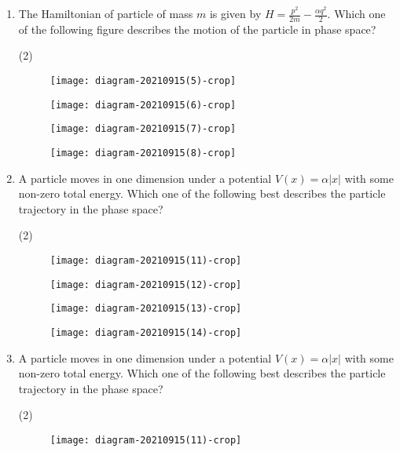 \begin{enumerate}
	\item The Hamiltonian of particle of mass $m$ is given by $H=\frac{p^{2}}{2 m}-\frac{\alpha q^{2}}{2}$. Which one of the following figure describes the motion of the particle in phase space?
	{}
	
	\begin{tasks}(2)
		\task[\textbf{A.}]\begin{figure}[H]
			\centering
			\texttt{[image: diagram-20210915(5)-crop]}
		\end{figure}
		\task[\textbf{B.}]\begin{figure}[H]
			\centering
			\texttt{[image: diagram-20210915(6)-crop]}
		\end{figure}
		\task[\textbf{C.}]\begin{figure}[H]
			\centering
			\texttt{[image: diagram-20210915(7)-crop]}
		\end{figure}
		\task[\textbf{D.}]\begin{figure}[H]
			\centering
			\texttt{[image: diagram-20210915(8)-crop]}
		\end{figure}
	\end{tasks}
	\item A particle moves in one dimension under a potential $V(x)=\alpha|x|$ with some non-zero total energy. Which one of the following best describes the particle trajectory in the phase space?
	{}
	
	\begin{tasks}(2)
		\task[\textbf{A.}]\begin{figure}[H]
			\centering
			\texttt{[image: diagram-20210915(11)-crop]}
			
		\end{figure}
		\task[\textbf{B.}]\begin{figure}[H]
			\centering
			\texttt{[image: diagram-20210915(12)-crop]}
		\end{figure}
		\task[\textbf{C.}]\begin{figure}[H]
			\centering
			\texttt{[image: diagram-20210915(13)-crop]}
		\end{figure}
		\task[\textbf{D.}]\begin{figure}[H]
			\centering
			\texttt{[image: diagram-20210915(14)-crop]}
		\end{figure}
	\end{tasks}	
	\item A particle moves in one dimension under a potential $V(x)=\alpha|x|$ with some non-zero total energy. Which one of the following best describes the particle trajectory in the phase space?
	{}
	\begin{tasks}(2)
		\task[\textbf{A.}]\begin{figure}[H]
			\centering
			\texttt{[image: diagram-20210915(11)-crop]}
			

\end{figure}
\end{tasks}
\end{enumerate}
